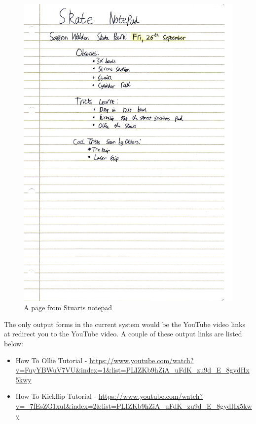 \begin{figure}[H]
    \includegraphics[width=\textwidth]{./Analysis/Notepad.pdf}
    \caption{A page from Stuarts notepad} \label{fig:Notepad Page}
\end{figure}

The only output forms in the current system would be the YouTube video links at redirect you to the YouTube video. A couple of these output links are listed below:

\begin{itemize}
\item How To Ollie Tutorial -  \url{https://www.youtube.com/watch?v=FuyYBWuV7VU&index=1&list=PLIZKb9hZiA_uFdK_zu9d_E_8gydHx5kwy}
\item How To Kickflip Tutorial -  \url{https://www.youtube.com/watch?v=_7fEsZG1xuI&index=2&list=PLIZKb9hZiA_uFdK_zu9d_E_8gydHx5kwy}
\end{itemize}

